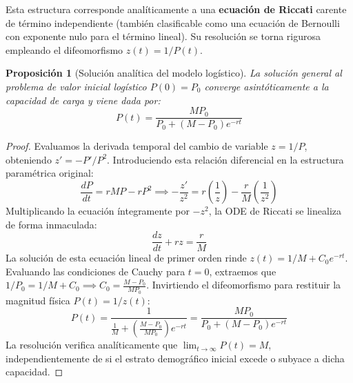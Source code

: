 \documentclass[11pt,a4paper]{article}
\theoremstyle{definition}
\theoremstyle{plain}
\newtheorem{proposition}{Proposición}[section]
\begin{document}
Esta estructura corresponde analíticamente a una \textbf{ecuación de Riccati} carente de término independiente (también clasificable como una ecuación de Bernoulli con exponente nulo para el término lineal). Su resolución se torna rigurosa empleando el difeomorfismo $z(t) = 1/P(t)$.

\begin{proposition}[Solución analítica del modelo logístico]
La solución general al problema de valor inicial logístico $P(0) = P_0$ converge asintóticamente a la capacidad de carga y viene dada por:
\begin{equation}
    P(t) = \frac{M P_0}{P_0 + (M - P_0)e^{-rt}}
\end{equation}
\end{proposition}

\begin{proof}
Evaluamos la derivada temporal del cambio de variable $z = 1/P$, obteniendo $z' = -P'/P^2$. Introduciendo esta relación diferencial en la estructura paramétrica original:
\begin{equation*}
    \frac{dP}{dt} = rMP - rP^2 \implies -\frac{z'}{z^2} = r\left(\frac{1}{z}\right) - \frac{r}{M}\left(\frac{1}{z^2}\right)
\end{equation*}
Multiplicando la ecuación íntegramente por $-z^2$, la ODE de Riccati se linealiza de forma inmaculada:
\begin{equation*}
    \frac{dz}{dt} + rz = \frac{r}{M}
\end{equation*}
La solución de esta ecuación lineal de primer orden rinde $z(t) = 1/M + C_0 e^{-rt}$. Evaluando las condiciones de Cauchy para $t=0$, extraemos que $1/P_0 = 1/M + C_0 \implies C_0 = \frac{M - P_0}{M P_0}$. 
Invirtiendo el difeomorfismo para restituir la magnitud física $P(t) = 1/z(t)$:
\begin{equation*}
    P(t) = \frac{1}{\frac{1}{M} + \left( \frac{M - P_0}{M P_0} \right) e^{-rt}} = \frac{M P_0}{P_0 + (M - P_0)e^{-rt}}
\end{equation*}
La resolución verifica analíticamente que $\lim_{t \to \infty} P(t) = M$, independientemente de si el estrato demográfico inicial excede o subyace a dicha capacidad.
\end{proof}
\end{document}
